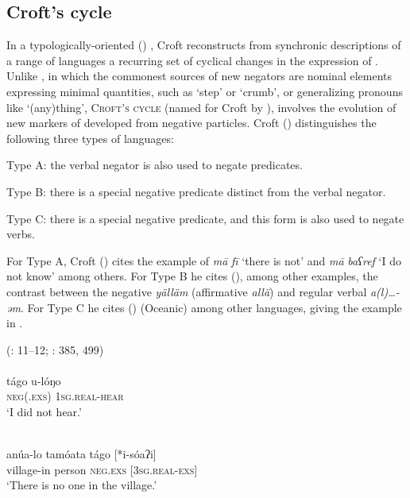 \documentclass[output=paper]{langsci/langscibook}
\begin{document}
\subsection{Croft’s cycle}


In a typologically-oriented (\citeyear{Croft1991}) , Croft reconstructs from synchronic descriptions of a range of languages a recurring set of cyclical changes in the expression of . Unlike , in which the commonest sources of new negators are nominal elements expressing minimal quantities, such as ‘step’ or ‘crumb’, or generalizing pronouns like ‘(any)thing’, \textsc{Croft’s} \textsc{cycle} (named for Croft by \citealt{Kahrel1996}), involves the evolution of new markers of  developed from negative  particles. Croft (\citeyear[6]{Croft1991}) distinguishes the following three types of languages:

\begin{altdescription}
	\item[Type A:] the verbal negator is also used to negate  predicates.
	\item[Type B:] there is a special negative  predicate distinct from the verbal negator.
	\item[Type C:] there is a special negative  predicate, and this form is also used to negate verbs.
\end{altdescription}

For Type A, Croft (\citeyear[7]{Croft1991}) cites the example of   \textit{mā} \textit{fī} ‘there is not’ and \textit{mā} \textit{baʕref} ‘I do not know’ among others. For Type B he cites (\citeyear[9]{Croft1991}), among other examples, the contrast between the  negative  \textit{yälläm} (affirmative  \textit{allä}) and regular verbal  \textit{a(l)…-əm}. For Type C he cites (\citeyear[11--12]{Croft1991})  (Oceanic) among other languages, giving the example in .


\ea\label{man}
{ (\citealt{Croft1991}: 11–12; \citealt{Lichtenberk1983}: 385, 499)}\\
\\
\gll tágo u-lóŋo\\
     \textsc{neg(.exs)} \textsc{1sg.real-}\textsc{\textup{hear}}  \\
\glt ‘I did not hear.’

\\
\gll anúa-lo tamóata tágo [*i-sóaʔi]\\
     village-in person \textsc{neg.exs} \textsc{[3sg.real-exs]}\\
\glt  ‘There is no one in the village.’
\z
\z
\end{document}
